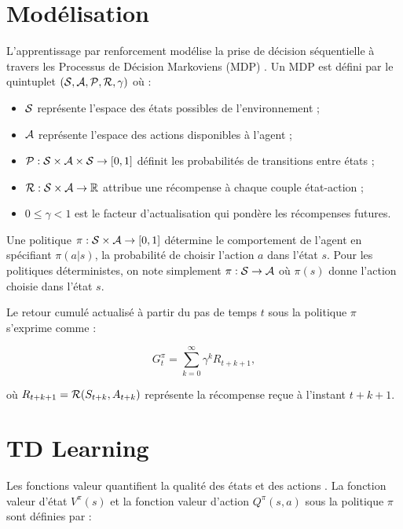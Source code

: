 \documentclass[a4paper, 12pt]{report}
\begin{document}
    \section{Modélisation}

  L'apprentissage par renforcement modélise la prise de décision séquentielle à
  travers les Processus de Décision Markoviens (MDP) \cite{10.5555/3312046}. Un
  MDP est défini par le quintuplet $(\cal{S}, \cal{A}, \cal{P}, \cal{R},
  \gamma)$ où :


    \begin{itemize}
      \item $\cal{S}$ représente l'espace des états possibles de l'environnement ;
      \item $\cal{A}$ représente l'espace des actions disponibles à l'agent ;
      \item $\cal{P} : \cal{S} \times \cal{A} \times \cal{S} \rightarrow [\text{0}, \text{1}]$ définit les probabilités de transitions entre états ;
      \item $\cal{R} : \cal{S} \times \cal{A} \rightarrow \mathbb{R}$ attribue une récompense à chaque couple état-action ;
      \item $0 \leq \gamma < 1$ est le facteur d'actualisation qui pondère les récompenses futures.
    \end{itemize}

    Une politique $\pi : \cal{S} \times \cal{A} \rightarrow [\text{0},
    \text{1}]$ détermine le comportement de l'agent en spécifiant $\pi(a|s)$,
    la probabilité de choisir l'action $a$ dans l'état $s$. Pour les politiques
    déterministes, on note simplement $\pi : \cal{S} \rightarrow \cal{A}$ où
    $\pi(s)$ donne l'action choisie dans l'état $s$.

    Le retour cumulé actualisé à partir du pas de temps $t$ sous la politique
    $\pi$ s'exprime comme :

    $$
    G_t^\pi = \sum_{k=0}^\infty \gamma^k R_{t+k+1},
    $$

    où $R_{t+k+1} = {\cal{R}}(S_{t + k}, A_{t + k})$ représente la récompense reçue à l'instant $t+k+1$.
  
    \section{TD Learning}

    Les fonctions valeur quantifient la qualité des états et des actions . La
    fonction valeur d'état $V^\pi (s)$ et la fonction valeur d'action $Q^\pi
    (s, a)$ sous la politique $\pi$ sont définies par :
\end{document}
